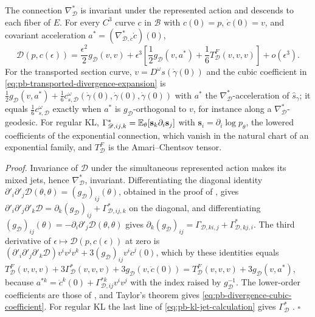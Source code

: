 The connection \(\nabla^*_{\mathscr D}\) is invariant under the represented action and descends to
each fiber of \(E\). For every \(C^3\) curve \(c\) in \(\mathcal B\) with \(c(0)=p\),
\(\dot c(0)=v\), and covariant acceleration \(a^*=(\nabla^*_{\mathscr D,\dot c}\dot c)(0)\),
\begin{equation}
\mathscr D(p,c(\epsilon))
=\frac{\epsilon^2}{2}g_{\mathscr D}(v,v)
+\epsilon^3\left[\frac12g_{\mathscr D}(v,a^*)
+\frac16T^F_{\mathscr D}(v,v,v)\right]
+o(\epsilon^3).
\label{eq:pb-divergence-cubic-coefficient}
\end{equation}
For the transported section curve, \(v=D^\omega s(\dot\gamma(0))\) and the cubic coefficient in
\eqref{eq:pb-transported-divergence-expansion} is
\(\tfrac12g_{\mathscr D}(v,a^*)+\tfrac16c^\omega_{s,\mathscr D}(\dot\gamma(0),\dot\gamma(0),\dot\gamma(0))\)
with \(a^*\) the \(\nabla^*_{\mathscr D}\)-acceleration of \(\widehat s_\gamma\); it equals
\(\tfrac16c^\omega_{s,\mathscr D}\) exactly when \(a^*\) is \(g_{\mathscr D}\)-orthogonal to \(v\), for
instance along a \(\nabla^*_{\mathscr D}\)-geodesic. For regular KL,
\(\Gamma^*_{\mathscr D,ij,k}=\mathbb E_\theta[\mathbf s_k\partial_i\mathbf s_j]\) with
\(\mathbf s_i=\partial_i\log p_\theta\), the lowered coefficients of the exponential connection, which
vanish in the natural chart of an exponential family, and \(T^F_{\mathscr D}\) is the
Amari--Chentsov tensor. 

\noindent\emph{Proof.}
Invariance of \(\mathscr D\) under the simultaneous represented action makes its mixed jets, hence
\(\nabla^*_{\mathscr D}\), invariant. Differentiating the diagonal identity
\(\partial'_i\partial'_j\mathscr D(\theta,\theta)=(g_{\mathscr D})_{ij}(\theta)\), obtained in the proof
of , gives
\(\partial'_i\partial'_j\partial'_k\mathscr D=\partial_k(g_{\mathscr D})_{ij}+\Gamma^*_{\mathscr D,ij,k}\)
on the diagonal, and differentiating
\((g_{\mathscr D})_{ij}(\theta)=-\partial_i\partial'_j\mathscr D(\theta,\theta)\) gives
\(\partial_k(g_{\mathscr D})_{ij}=\Gamma_{\mathscr D,ki,j}+\Gamma^*_{\mathscr D,kj,i}\). The third
derivative of \(\epsilon\mapsto\mathscr D(p,c(\epsilon))\) at zero is
\((\partial'_i\partial'_j\partial'_k\mathscr D)v^iv^jv^k+3(g_{\mathscr D})_{ij}v^i\ddot c^j(0)\), which by
these identities equals
\(T^F_{\mathscr D}(v,v,v)+3\Gamma^*_{\mathscr D}(v,v,v)+3g_{\mathscr D}(v,\ddot c(0))
=T^F_{\mathscr D}(v,v,v)+3g_{\mathscr D}(v,a^*)\), because
\(a^{*k}=\ddot c^k(0)+\Gamma^{*k}_{\mathscr D,ij}v^iv^j\) with the index raised by
\(g_{\mathscr D}^{-1}\). The lower-order coefficients are those of
, and Taylor's theorem gives
\eqref{eq:pb-divergence-cubic-coefficient}. For regular KL the last line of
\eqref{eq:pb-kl-jet-calculation} gives \(\Gamma^*_{\mathscr D}\) \citep{AmariNagaoka2000}.
\hfill$\square$

